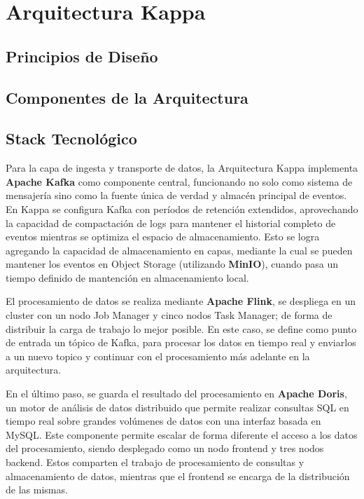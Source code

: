 \section{Arquitectura Kappa}

\subsection{Principios de Diseño}
\subsection{Componentes de la Arquitectura}
\subsection{Stack Tecnológico}

Para la capa de ingesta y transporte de datos, la Arquitectura Kappa implementa \textbf{Apache Kafka} como componente central, 
funcionando no solo como sistema de mensajería sino como la fuente única de verdad y almacén principal de eventos. 
En Kappa se configura Kafka con períodos de retención extendidos, 
aprovechando la capacidad de compactación de logs para mantener el historial completo de eventos mientras 
se optimiza el espacio de almacenamiento. 
Esto se logra agregando la capacidad de almacenamiento en capas, mediante la cual se pueden mantener los eventos
en Object Storage (utilizando \textbf{MinIO}), cuando pasa un tiempo definido de mantención en almacenamiento local.

El procesamiento de datos se realiza mediante \textbf{Apache Flink},
se despliega en un cluster con un nodo Job Manager y cinco nodos Task Manager; de forma de distribuir la carga de trabajo lo mejor posible.
En este caso, se define como punto de entrada un tópico de Kafka, para procesar los datos en tiempo real y
enviarlos a un nuevo topico y continuar con el procesamiento más adelante en la arquitectura.

En el último paso, se guarda el resultado del procesamiento en \textbf{Apache Doris}, un motor de análisis de datos
distribuido que permite realizar consultas SQL en tiempo real sobre grandes volúmenes de datos con una interfaz basada en MySQL.
Este componente permite escalar de forma diferente el acceso a los datos del procesamiento, 
siendo desplegado como un nodo frontend y tres nodos backend. 
Estos comparten el trabajo de procesamiento de consultas y almacenamiento de datos, 
mientras que el frontend se encarga de la distribución de las mismas. 
